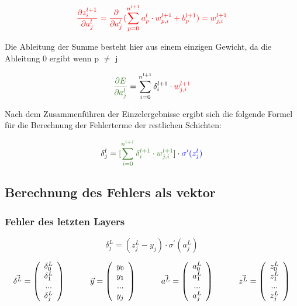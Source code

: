 \documentclass{article}
\begin{document}
\[ \textcolor{red}{ \frac{\partial z_i^{l+1}}{\partial a_j^{l}}
= \frac{\partial}{\partial a_j^{l}} (\sum_{p = 0}^{n^{l+1}} a_p^{l} \cdot w_{p,i}^{l+1} + b_p^{l+1}) = w_{j, i}^{l+1} } \]
\begin{flushleft}
    Die Ableitung der Summe besteht hier aus einem einzigen Gewicht, da die Ableitung $0$ ergibt wenn p $\neq$ j
\end{flushleft}
\[ \textcolor{OliveGreen}{ \frac{\partial E}{\partial a_j^{l}} } = \sum_{i = 0}^{n^{l+1}} \delta_i^{l+1} \cdot \textcolor{red}{ w_{j,i}^{l+1} } \]
\begin{flushleft}
    Nach dem Zusammenführen der Einzelergebnisse ergibt sich die folgende Formel für die Berechnung der Fehlerterme der restlichen Schichten:
\end{flushleft}
\[ \delta_j^{l} = \textcolor{OliveGreen}{[\sum_{i = 0}^{n^{l+1}} \delta_i^{l+1} \cdot w_{j,i}^{l+1} }] \cdot \textcolor{blue}{ \sigma^{\prime}(z_j^{l}) } \]
\subsection{Berechnung des Fehlers als vektor}


\subsubsection{Fehler des letzten Layers}
\[ \delta_j^L = (z_j^L - y_j) \cdot \sigma^{\prime} (a_j^L)  \]

\[ \vec{\delta^L} = \left( \begin{array}{c}
     \delta_0^L \\ \delta_1^L \\ ... \\ \delta_j^L 
\end{array} \right)
\kern 30pt
\vec{y} = \left( \begin{array} {c}
    y_0 \\ y_1 \\ ... \\ y_j
\end{array} \right) 
\kern 30pt
\vec{a^L} = \left(\begin{array}{c}
    a_0^L \\ a_1^L \\ ... \\ a_j^L
\end{array} \right) 
\kern 30pt
\vec{z^L} = \left(\begin{array}{c}
    z_0^L \\ z_1^L \\ ... \\ z_j^L
\end{array} \right) 
\]
\end{document}
